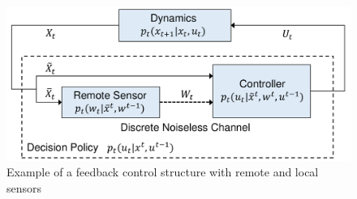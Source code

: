 \begin{figure}
\centering
\includegraphics[width=\columnwidth]{comm.pdf}
\caption{Example of a feedback control structure with remote and local sensors}
\label{fig:NCS}
\end{figure}


